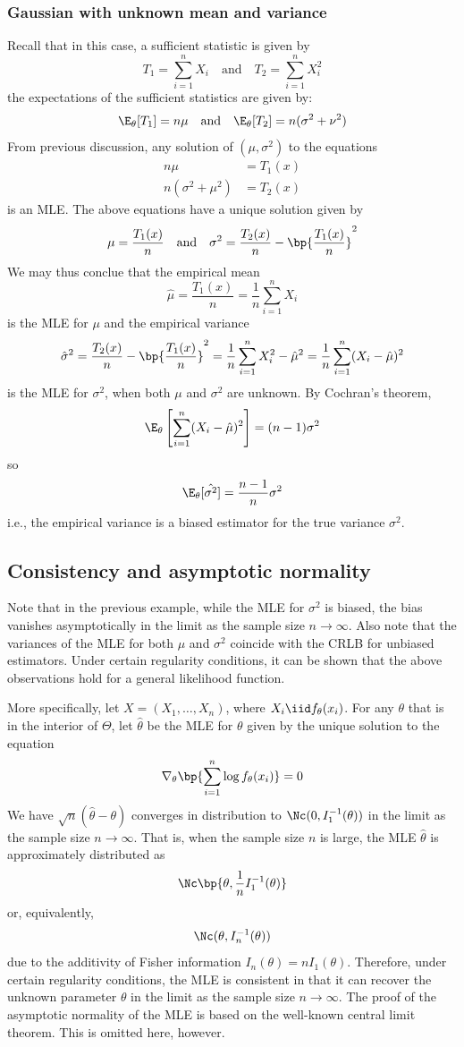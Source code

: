 \subsubsection{Gaussian with unknown mean and variance}
Recall that in this case, a sufficient statistic is given by
\[
    T_1 = \sum_{i=1}^n X_i \quad\text{and}\quad T_2 = \sum_{i=1}^n X_i^2
\]
the expectations of the sufficient statistics are given by:
\[
    \E_\theta[T_1] = n\mu \quad\text{and}\quad \E_\theta[T_2] = n(\sigma^2 + \nu^2)
\]
From previous discussion, any solution of $(\mu, \sigma^2)$ to the equations
\begin{align*}
    n\mu                & = T_1(x) \\
    n(\sigma^2 + \mu^2) & = T_2(x)
\end{align*}
is an MLE. The above equations have a unique solution given by
\[
    \mu = \frac{T_1(x)}{n} \quad\text{and}\quad \sigma^2 = \frac{T_2(x)}{n} - \bp{\frac{T_1(x)}{n}}^2
\]
We may thus conclue that the empirical mean
\[
    \hat{\mu} = \frac{T_1(x)}{n} = \frac{1}{n} \sum_{i=1}^n X_i
\]
is the MLE for $\mu$ and the empirical variance
\[
    \hat{\sigma}^2 = \frac{T_2(x)}{n} - \bp{\frac{T_1(x)}{n}}^2 = \frac{1}{n}\sum_{i=1}^n X_i^2 - \hat{\mu}^2 = \frac{1}{n}\sum_{i=1}^n (X_i - \hat{\mu})^2
\]
is the MLE for $\sigma^2$, when both $\mu$ and $\sigma^2$ are unknown. By Cochran's theorem,
\[
    \E_\theta \left[ \sum_{i=1}^n (X_i - \hat{\mu})^2\right] = (n-1)\sigma^2
\]
so
\[
    \E_\theta[\hat{\sigma^2}] = \frac{n-1}{n}\sigma^2
\]
i.e., the empirical variance is a biased estimator for the true variance $\sigma^2$.

\subsection{Consistency and asymptotic normality}
Note that in the previous example, while the MLE for $\sigma^2$ is biased, the bias vanishes asymptotically in the limit as the sample size $n\to\infty$. Also note that the variances of the MLE for both $\mu$ and $\sigma^2$ coincide with the CRLB for unbiased estimators. Under certain regularity conditions, it can be shown that the above observations hold for a general likelihood function.

More specifically, let $X = (X_1, \dots, X_n)$, where $X_i \iid f_\theta(x_i)$. For any $\theta$ that is in the interior of $\Theta$, let $\hat{\theta}$ be the MLE for $\theta$ given by the unique solution to the equation
\[
    \nabla_\theta \bp{\sum_{i=1}^n \log f_\theta(x_i)} = 0
\]
We have $\sqrt{n}(\hat{\theta} - \theta)$ converges in distribution to $\Nc(0, I_1^{-1}(\theta))$ in the limit as the sample size $n\to\infty$.
That is, when the sample size $n$ is large, the MLE $\hat{\theta}$ is approximately distributed as
\[
    \Nc \bp{\theta, \frac{1}{n}I_1^{-1}(\theta)}
\]
or, equivalently,
\[
    \Nc (\theta,I_n^{-1}(\theta))
\]
due to the additivity of Fisher information $I_n(\theta) = n I_1(\theta)$. Therefore, under certain regularity conditions, the MLE is consistent in that it can recover the unknown parameter $\theta$ in the limit as the sample size $n\to\infty$. The proof of the asymptotic normality of the MLE is based on the well-known central limit theorem. This is omitted here, however.

